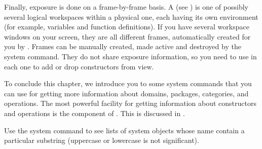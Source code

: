 Finally, exposure is done on a frame-by-frame basis.
A  (see )
is one of possibly several
logical \Language{} workspaces within a physical one, each having
its own environment (for example, variables and function definitions).
If you have several \Language{} workspace windows on your screen, they
are all different frames, automatically created for you by \HyperName{}.
Frames can be manually created, made active and destroyed by the
 system command.
They do not share exposure information, so you need to use
 in each one to add or drop constructors from view.


To conclude this chapter, we introduce you to some system commands
that you can use for getting more information about domains,
packages, categories, and operations.
The most powerful \Language{} facility for getting information about
constructors and operations is the \Browse{} component of \HyperName{}.
This is discussed in .

Use the  system command to see lists of system objects
whose name contain a particular substring (uppercase or lowercase is
not significant).

